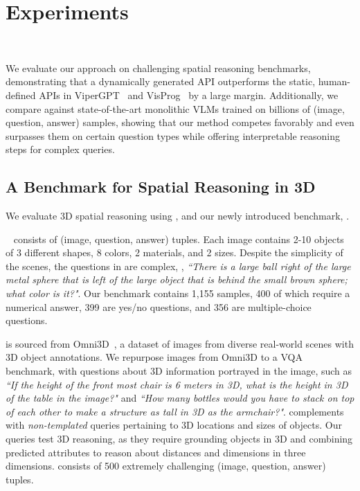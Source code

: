 \section{Experiments}
\label{sec:experiments}\

We evaluate our approach on challenging spatial reasoning benchmarks, demonstrating that a dynamically generated API outperforms the static, human-defined APIs in ViperGPT~\cite{vipergpt} and VisProg~\cite{visprog} by a large margin. Additionally, we compare against state-of-the-art monolithic VLMs trained on billions of (image, question, answer) samples, showing that our method competes favorably and even surpasses them on certain question types while offering interpretable reasoning steps for complex queries.


\subsection{A Benchmark for Spatial Reasoning in 3D}
We evaluate 3D spatial reasoning using \clevr, and our newly introduced benchmark, \ourbench.

\mypar{\clevr}~\cite{clevr} consists of (image, question, answer) tuples. Each image contains 2-10 objects of 3 different shapes, 8 colors, 2 materials, and 2 sizes. Despite the simplicity of the scenes, the questions in \clevr are complex, \eg, \emph{``There is a large ball right of the large metal sphere that is left of the large object that is behind the small brown sphere; what color is it?"}. Our \clevr benchmark contains 1,155 samples, 400 of which require a numerical answer, 399 are yes/no questions, and 356 are multiple-choice questions.

\mypar{\ourbench} is sourced from Omni3D~\cite{omni3d}, a dataset of images from diverse real-world scenes with 3D object annotations. We repurpose images from Omni3D to a VQA benchmark, with questions about 3D information portrayed in the image, such as \emph{``If the height of the front most chair is 6 meters in 3D, what is the height in 3D of the table in the image?"} and \emph{``How many bottles would you have to stack on top of each other to make a structure as tall in 3D as the armchair?"}. \ourbench complements \clevr with \emph{non-templated} queries pertaining to 3D locations and sizes of objects. 
Our queries test 3D reasoning, as they require grounding objects in 3D and combining predicted attributes to reason about distances and dimensions in three dimensions. \ourbench consists of 500 extremely challenging (image, question, answer) tuples. 


